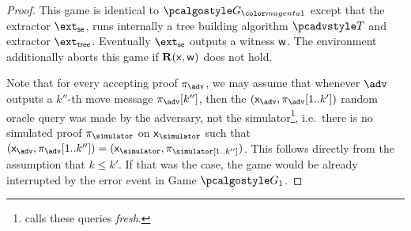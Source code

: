 \begin{proof}
	\iffalse
	\ngame{2} In this game the environment additionally aborts if $\extse$ fails to build a
	$(1, \ldots, 1, n_{k''}, \ldots, n_\mu)$-tree of accepting transcripts $\tree$ by rewinding
	$\adv$.
	
	\ncase{Game 1 to Game 2} Note that for every accepting proof $\zkproof_{\advse}$, we 	may assume that whenever $\advse$ outputs a $k''$-th move message $\zkproof_{\advse}[k'']$, then the $(\inp_{\advse}, \zkproof_{\advse}[1..k'])$ 	random oracle query was made by the adversary, not the simulator\footnote{\cite{INDOCRYPT:FKMV12} calls these queries \emph{fresh}.}, i.e.~there is no simulated proof $\zkproof_\simulator$ on $\inp_\simulator$ such that $(\inp_{\advse}, \zkproof_{\advse} [1..k'']) = (\inp_\simulator, \zkproof_\simulator[1..k''])$. This follows directly from the assumption that $k \leq k'$. If that was the case, the game would be already interrupted by the error event in Game $\game{1}$. As previously, we have $\abs{\prob{\game{1}} - \prob{\game{2}}} \leq \prob{\event{\errfrk}}$, where $\event{\errfrk}$ denotes the event of $\extse$ failing to build a $(1, \ldots, 1, n_{k''}, \ldots, n_\mu)$-tree of accepting transcripts. Let $\waccProb$ be the probability of $\advse$ producing an accepting transcript that does not break $\ur{k}$-ness of $\ps$. By special soundness of $\proofsystem_\fs$, \hamid{19.4}{discuss if $\epst(\secpar, \waccProb)$ here makes sense!}\michals{21.04}{Seems it does, why?}, we have 
		\begin{equation}
		\abs{\prob{\game{1}} - \prob{\game{2}}} \leq \prob{\event{\errfrk}} \leq 1 - 
		\epst(\secpar, \waccProb).
		\end{equation}		
	\fi
	
	 This game is identical to $\game{\changedm{1}}$ except that the extractor $\extse$, runs internally a tree building algorithm $\tdv$ and extractor $\extt$. Eventually $\extse$ outputs a witness $\mathsf{w}$. The environment additionally aborts this game if $\mathbf{R}(\mathsf{x}, \mathsf{w})$ does not hold.
	
	Note that for every accepting proof $\zkproof_{\advse}$, we 	may assume that whenever $\advse$ outputs a $k''$-th move message $\zkproof_{\advse}[k'']$, then the $(\inp_{\advse}, \zkproof_{\advse}[1..k'])$ 	random oracle query was made by the adversary, not the simulator\footnote{\cite{INDOCRYPT:FKMV12} calls these queries \emph{fresh}.}, i.e.~there is no simulated proof $\zkproof_\simulator$ on $\inp_\simulator$ such that $(\inp_{\advse}, \zkproof_{\advse} [1..k'']) = (\inp_\simulator, \zkproof_\simulator[1..k''])$. This follows directly from the assumption that $k \leq k'$. If that was the case, the game would be already interrupted by the error event in Game $\game{1}$.


\end{proof}
